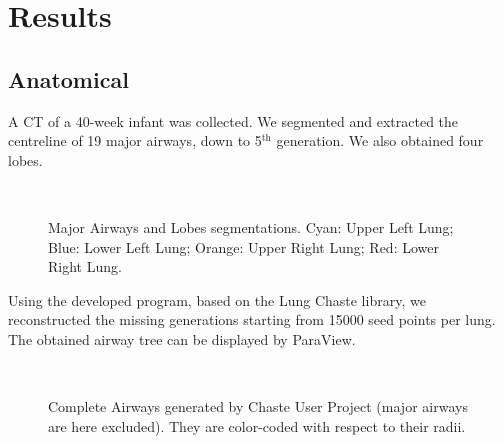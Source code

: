 \section{Results}
\label{sec:results}



\subsection{Anatomical}
\label{subsec:anatomical_results}


A CT of a 40-week infant was collected. We segmented and extracted the
centreline of 19 major airways, down to 5$^{\text{th}}$ generation.
We also obtained four lobes.


\begin{figure}[H]\centering
  \hspace{1cm}
  \\\vspace{1cm}

  \caption{Major Airways and Lobes segmentations.  Cyan: Upper Left
    Lung; Blue: Lower Left Lung; Orange: Upper Right Lung; Red: Lower
    Right Lung.}
  \label{fig:anatomical_results}
\end{figure}

Using the developed program, based on the Lung Chaste library, we
reconstructed the missing generations starting from 15000 seed points
per lung.  The obtained airway tree can be displayed by ParaView.

\begin{figure}[H]\centering
  \hspace{1cm}
  \\\vspace{1cm}

  \caption{Complete Airways generated by Chaste User Project (major
    airways are here excluded).  They are color-coded with respect to
    their radii.}
  \label{fig:complete_anatomical_results}
\end{figure}

